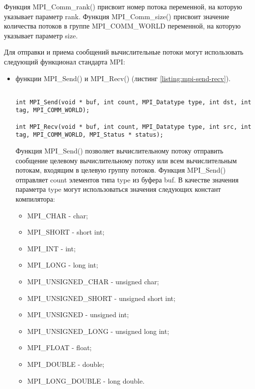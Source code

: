 Функция MPI\_Comm\_rank() присвоит номер потока переменной, на которую указывает параметр rank. Функция MPI\_Comm\_size() присвоит значение количества потоков в группе MPI\_COMM\_WORLD переменной, на которую указывает параметр size.

Для отправки и приема сообщений вычислительные потоки могут использовать следующий функционал стандарта MPI:

\begin{itemize}

	\item функции MPI\_Send() и MPI\_Recv() (листинг \ref{listing:mpi-send-recv}).

\begin{lstlisting}

int MPI_Send(void * buf, int count, MPI_Datatype type, int dst, int tag, MPI_COMM_WORLD);

int MPI_Recv(void * buf, int count, MPI_Datatype type, int src, int tag, MPI_COMM_WORLD, MPI_Status * status);

\end{lstlisting}
\mylistingend

	Функция MPI\_Send() позволяет вычислительному потоку отправить сообщение целевому вычислительному потоку или всем вычислительным потокам, входящим в целевую группу потоков. Функция MPI\_Send() отправляет count элементов типа type из буфера buf. В качестве значения параметра type могут использоваться значения следующих констант компилятора:

	\begin{itemize}

		\item MPI\_CHAR - char;
		\item MPI\_SHORT - short int;
		\item MPI\_INT - int;
		\item MPI\_LONG - long int;
		\item MPI\_UNSIGNED\_CHAR - unsigned char;
		\item MPI\_UNSIGNED\_SHORT - unsigned short int;
		\item MPI\_UNSIGNED - unsigned int;
		\item MPI\_UNSIGNED\_LONG - unsigned long int;
		\item MPI\_FLOAT - float;
		\item MPI\_DOUBLE - double;
		\item MPI\_LONG\_DOUBLE - long double.


\end{itemize}
\end{itemize}
